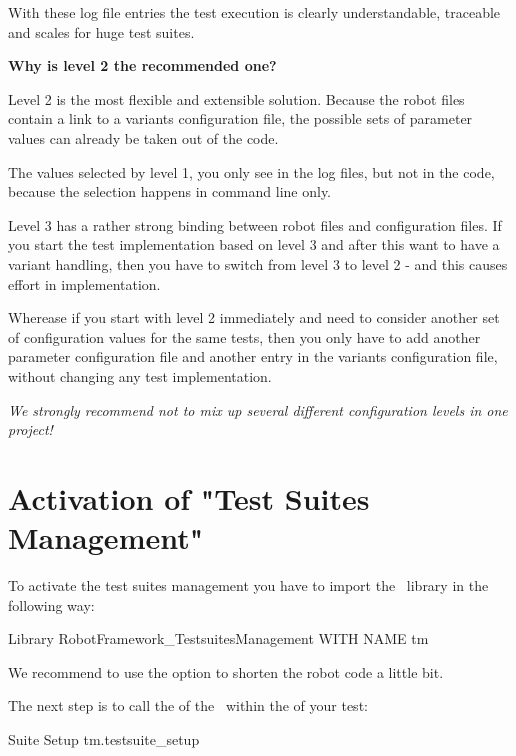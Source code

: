 With these log file entries the test execution is clearly understandable, traceable and scales for huge test suites.

\vspace{2ex}

\textbf{Why is level 2 the recommended one?}

Level 2 is the most flexible and extensible solution. Because the robot files contain a link to a variants configuration file,
the possible sets of parameter values can already be taken out of the code.

The values selected by level 1, you only see in the log files, but not in the code, because the selection happens in command line only.

Level 3 has a rather strong binding between robot files and configuration files. If you start the test implementation based on level 3
and after this want to have a variant handling, then you have to switch from level 3 to level 2 - and this causes effort in implementation.

Wherease if you start with level 2 immediately and need to consider another set of configuration values for the same tests, then you only have to add
another parameter configuration file and another entry in the variants configuration file, without changing any test implementation.

\textit{We strongly recommend not to mix up several different configuration levels in one project!}


\section{Activation of "Test Suites Management"}

To activate the test suites management you have to import the \pkg\ library in the following way:

\begin{robotcode}
Library    RobotFramework_TestsuitesManagement    WITH NAME    tm
\end{robotcode}

We recommend to use the  option to shorten the robot code a little bit.

The next step is to call the  of the \pkg\ within the  of your test:

\begin{robotcode}
Suite Setup    tm.testsuite_setup
\end{robotcode}

